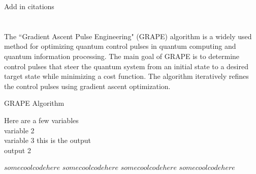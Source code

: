 Add in citations \cite{caneva_chopped_2011, muller_one_2022}

\section{}

The ``Gradient Ascent Pulse Engineering" (GRAPE) algorithm is a widely used method for optimizing quantum control pulses in quantum computing and quantum information processing. The main goal of GRAPE is to determine control pulses that steer the quantum system from an initial state to a desired target state while minimizing a cost function. The algorithm iteratively refines the control pulses using gradient ascent optimization.


\begin{algorithm}                     
\caption{GRAPE Algorithm}          
\label{findme}                          
\begin{algorithmic} [1]                   %
\REQUIRE    Here are a few variables \\
            variable 2 \\
            variable 3 
\ENSURE     this is the output \\
            output 2
\end{algorithmic}
\end{algorithm}

\begin{algorithm}                     
\begin{algorithmic} [1]                   %
\STATE $some cool code here$
\STATE $some cool code here$
\STATE $some cool code here$
\STATE $some cool code here$
\end{algorithmic}
\end{algorithm}

